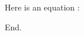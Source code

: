 \documentclass[a4paper,oneside,11pt]{book}
\begin{document}
 
    Here is an equation :
    \[
      
    \]

    End.
\end{document}

